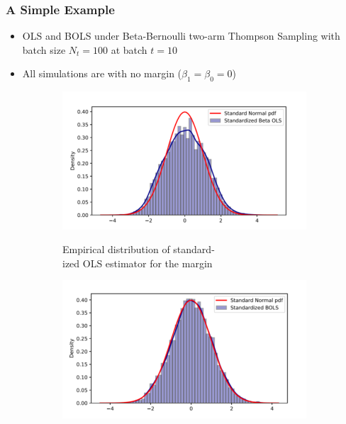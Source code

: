 \documentclass[11pt,table]{beamer}
\begin{document}
\begin{frame}\frametitle{A Simple Example}
\renewcommand{\baselinestretch}{1}

\begin{itemize}
    \item OLS and BOLS under Beta-Bernoulli two-arm Thompson Sampling with batch size $N_t=100$ at batch $t =10$
    \item All simulations are with no margin ($\beta_1=\beta_0=0$)
\end{itemize}
\begin{figure}[h]
\begin{center}
	\begin{subfigure}[t]{0.49\textwidth}
{\includegraphics[width=1\textwidth]{figures/grafik3}}
           \caption{Empirical distribution of standard-\\\quad\; ized OLS estimator for the margin}
           \label{fig:Empirical distribution of standardized OLS estimator for the margin}	
  \end{subfigure}%
	\begin{subfigure}[t]{0.49\textwidth}
{\includegraphics[width=1\textwidth]{figures/grafik4.png}}

\end{subfigure}
\end{center}
\end{figure}
\end{frame}
\end{document}

